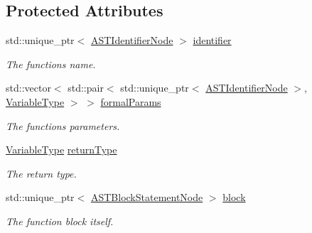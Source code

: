 \subsection*{Protected Attributes}
\begin{DoxyCompactItemize}
\item 
\mbox{\label{classparser_1_1ast_1_1ASTFunctionDeclStatementNode_a0a989fb6f81a61710fb6dcd0e8f8b627}} 
std\+::unique\+\_\+ptr$<$ \hyperlink{classparser_1_1ast_1_1ASTIdentifierNode}{A\+S\+T\+Identifier\+Node} $>$ \hyperlink{classparser_1_1ast_1_1ASTFunctionDeclStatementNode_a0a989fb6f81a61710fb6dcd0e8f8b627}{identifier}
\begin{DoxyCompactList}\small\item\em The function\textquotesingle{}s name. \end{DoxyCompactList}\item 
\mbox{\label{classparser_1_1ast_1_1ASTFunctionDeclStatementNode_ab89bd3acd8be42103084a7043018a485}} 
std\+::vector$<$ std\+::pair$<$ std\+::unique\+\_\+ptr$<$ \hyperlink{classparser_1_1ast_1_1ASTIdentifierNode}{A\+S\+T\+Identifier\+Node} $>$, \hyperlink{ASTVariableDeclStatementNode_8h_a1e8e1bde0729627e3a22ffa858d5f3b9}{Variable\+Type} $>$ $>$ \hyperlink{classparser_1_1ast_1_1ASTFunctionDeclStatementNode_ab89bd3acd8be42103084a7043018a485}{formal\+Params}
\begin{DoxyCompactList}\small\item\em The function\textquotesingle{}s parameters. \end{DoxyCompactList}\item 
\mbox{\label{classparser_1_1ast_1_1ASTFunctionDeclStatementNode_a599bee08b41465e1787471f76069181f}} 
\hyperlink{ASTVariableDeclStatementNode_8h_a1e8e1bde0729627e3a22ffa858d5f3b9}{Variable\+Type} \hyperlink{classparser_1_1ast_1_1ASTFunctionDeclStatementNode_a599bee08b41465e1787471f76069181f}{return\+Type}
\begin{DoxyCompactList}\small\item\em The return type. \end{DoxyCompactList}\item 
\mbox{\label{classparser_1_1ast_1_1ASTFunctionDeclStatementNode_a9c6e0d925487c0f9b9770de8f84b0377}} 
std\+::unique\+\_\+ptr$<$ \hyperlink{classparser_1_1ast_1_1ASTBlockStatementNode}{A\+S\+T\+Block\+Statement\+Node} $>$ \hyperlink{classparser_1_1ast_1_1ASTFunctionDeclStatementNode_a9c6e0d925487c0f9b9770de8f84b0377}{block}
\begin{DoxyCompactList}\small\item\em The function block itself. \end{DoxyCompactList}\end{DoxyCompactItemize}


